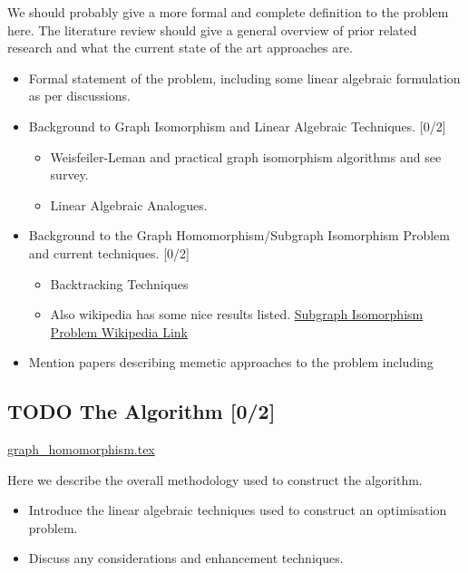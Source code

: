 \documentclass[11pt]{article}
\begin{document}
We should probably give a more formal and complete definition to the problem here.
The literature review should give a general overview of prior related research and what the current state of the art approaches are.

\begin{itemize}
\item[{$\square$}] Formal statement of the problem, including some linear algebraic formulation as per discussions.
\item[{$\square$}] Background to Graph Isomorphism and Linear Algebraic Techniques. [0/2]
\begin{itemize}
\item[{$\square$}] Weisfeiler-Leman and practical graph isomorphism algorithms \autocite{WeisfeilerLeman1968} and see survey\autocite{GroheNeuen2021a}.
\item[{$\square$}] Linear Algebraic Analogues\autocite{LiQiao2017}\autocite{BrooksbankEtAl2019}\autocite{ChenEtAl2024}.
\end{itemize}
\item[{$\square$}] Background to the Graph Homomorphism/Subgraph Isomorphism Problem and current techniques. [0/2]
\begin{itemize}
\item[{$\square$}] Backtracking Techniques\autocite{JuttnerMadarasi2018,CarlettiEtAl2017}
\item[{$\square$}] Also wikipedia has some nice results listed. \href{https://en.wikipedia.org/wiki/Subgraph\_isomorphism\_problem}{Subgraph Isomorphism Problem Wikipedia Link}
\end{itemize}
\item[{$\square$}] Mention papers describing memetic approaches to the problem including \autocite{HaqueEtAl2019}
\end{itemize}
\subsection{{\bfseries\sffamily TODO} The Algorithm [0/2]}
\label{sec:org614c2c5}
\url{graph\_homomorphism.tex}

Here we describe the overall methodology used to construct the algorithm.

\begin{itemize}
\item[{$\square$}] Introduce the linear algebraic techniques used to construct an optimisation problem.
\item[{$\square$}] Discuss any considerations and enhancement techniques.
\end{itemize}
\end{document}

